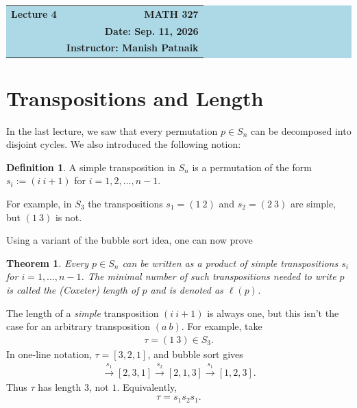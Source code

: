 \documentclass[reqno,11pt]{amsart}
\theoremstyle{definition}
\newtheorem{define}{Definition}[section]
\theoremstyle{plain}
\newtheorem{theorem}{Theorem}[section]
\theoremstyle{remark}
\numberwithin{equation}{section}
\newcommand{\be}{\begin{eqnarray}}
\newcommand{\ee}{\end{eqnarray}}
\begin{document}
\begin{center}
  \colorbox{lightblue}{%
    \begin{minipage}{0.94\textwidth}
      \vspace{0.55em}
      \begin{tabular*}{\textwidth}{@{\extracolsep{\fill}}lr}
        {\color{courseblue}\bfseries\LARGE Lecture 4} &
        {\color{courseblue}\bfseries\LARGE MATH 327}\\[0.35em]
         & \textbf{Date: Sep. 11, 2026}\\
        & \textbf{Instructor: Manish Patnaik}
      \end{tabular*}
      \vspace{0.45em}
    \end{minipage}}
\end{center}

\par

\setcounter{tocdepth}{1}
\tableofcontents



\section{Transpositions and Length}

In the last lecture, we saw that every permutation $p \in S_n$ can be decomposed into disjoint cycles. We also introduced the following notion:

\begin{define} A simple transposition in $S_n$ is a permutation of the form $s_i:= (i\ i+1)$ for $i=1, 2, \ldots, n-1$.  \end{define}

For example, in $S_3$ the transpositions $s_1=(1\ 2)$ and $s_2=(2\ 3)$ are simple, but $(1\ 3)$ is not.

Using a variant of the bubble sort idea, one can now prove

\begin{theorem} Every $p \in S_n$ can be written as a product of simple transpositions $s_i$ for $i=1, \ldots, n-1$. The minimal number of such transpositions needed to write $p$ is called the (Coxeter) length of $p$ and is denoted as $\ell(p)$.
\end{theorem}

\begin{warning}
	The length of a \textit{simple} transposition $(i\ i+1)$ is always one, but this isn't the case for an arbitrary transposition $(a\ b)$. For example, take
	\be
	\tau=(1\ 3)\in S_3.
	\ee
	In one-line notation,
	$\tau=[3,2,1]$, and bubble sort gives
	\be
	[3,2,1]
	\xrightarrow{\ s_1\ }[2,3,1]
	\xrightarrow{\ s_2\ }[2,1,3]
	\xrightarrow{\ s_1\ }[1,2,3].
	\ee
	Thus $\tau$ has length $3$, not $1$. Equivalently,
	\be
	\tau=s_1s_2s_1.
	\ee
\end{warning}
\end{document}
